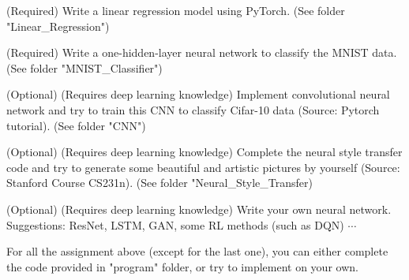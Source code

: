 \documentclass[english]{../TeXTemplate/pkupaper}
\begin{document}
\begin{partlist}
\item (Required) Write a linear regression model using PyTorch. (See folder "Linear\_Regression")
\item (Required) Write a one-hidden-layer neural network to classify the MNIST data. (See folder "MNIST\_Classifier")
\item (Optional) (Requires deep learning knowledge) Implement convolutional neural network and try to train this CNN to classify Cifar-10 data (Source: Pytorch tutorial). (See folder "CNN")
\item (Optional) (Requires deep learning knowledge) Complete the neural style transfer code and try to generate some beautiful and artistic pictures by yourself (Source: Stanford Course CS231n). (See folder "Neural\_Style\_Transfer)
\item (Optional) (Requires deep learning knowledge) Write your own neural network. Suggestions: ResNet, LSTM, GAN, some RL methods (such as DQN) $\cdots$
\end{partlist}

\par For all the assignment above (except for the last one), you can either complete the code provided in "program" folder, or try to implement on your own.
 
\end{document}
